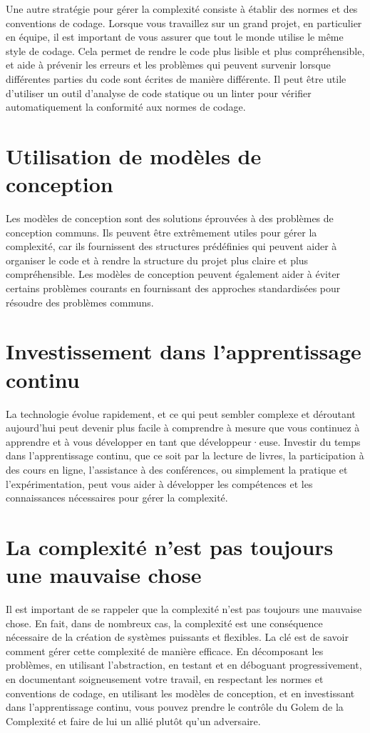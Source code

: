 Une autre stratégie pour gérer la complexité consiste à établir des normes et des conventions de codage. Lorsque vous travaillez sur un grand projet, en particulier en équipe, il est important de vous assurer que tout le monde utilise le même style de codage. Cela permet de rendre le code plus lisible et plus compréhensible, et aide à prévenir les erreurs et les problèmes qui peuvent survenir lorsque différentes parties du code sont écrites de manière différente. Il peut être utile d'utiliser un outil d'analyse de code statique ou un linter pour vérifier automatiquement la conformité aux normes de codage.

\section{Utilisation de modèles de conception}

Les modèles de conception sont des solutions éprouvées à des problèmes de conception communs. Ils peuvent être extrêmement utiles pour gérer la complexité, car ils fournissent des structures prédéfinies qui peuvent aider à organiser le code et à rendre la structure du projet plus claire et plus compréhensible. Les modèles de conception peuvent également aider à éviter certains problèmes courants en fournissant des approches standardisées pour résoudre des problèmes communs.

\section{Investissement dans l'apprentissage continu}

La technologie évolue rapidement, et ce qui peut sembler complexe et déroutant aujourd'hui peut devenir plus facile à comprendre à mesure que vous continuez à apprendre et à vous développer en tant que développeur·euse. Investir du temps dans l'apprentissage continu, que ce soit par la lecture de livres, la participation à des cours en ligne, l'assistance à des conférences, ou simplement la pratique et l'expérimentation, peut vous aider à développer les compétences et les connaissances nécessaires pour gérer la complexité.

\section{La complexité n'est pas toujours une mauvaise chose}

Il est important de se rappeler que la complexité n'est pas toujours une mauvaise chose. En fait, dans de nombreux cas, la complexité est une conséquence nécessaire de la création de systèmes puissants et flexibles. La clé est de savoir comment gérer cette complexité de manière efficace. En décomposant les problèmes, en utilisant l'abstraction, en testant et en déboguant progressivement, en documentant soigneusement votre travail, en respectant les normes et conventions de codage, en utilisant les modèles de conception, et en investissant dans l'apprentissage continu, vous pouvez prendre le contrôle du Golem de la Complexité et faire de lui un allié plutôt qu'un adversaire.

